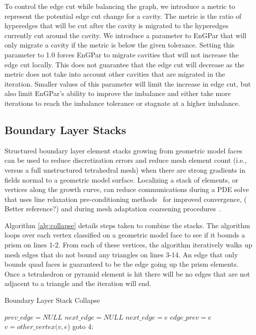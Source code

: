 \documentclass[conference]{IEEEtran}
\begin{document}
To control the edge cut while balancing the graph, we introduce a metric to represent the
potential edge cut change for a cavity. The metric is the ratio of hyperedges that will be cut
after the cavity is migrated to the hyperedges currently cut around the cavity. We introduce a
parameter to EnGPar that will only migrate a cavity if the metric is below the given tolerance.
Setting this parameter to 1.0 forces EnGPar to migrate cavities that will not increase the edge
cut locally. This does not guarantee that the edge cut will decrease as the metric does not take
into account other cavities that are migrated in the iteration. Smaller values of this
parameter will limit the increase in edge cut, but also limit EnGPar's ability to improve the
imbalance and either take more iterations to reach the imbalance tolerance or stagnate at a
higher imbalance.

\subsection{Boundary Layer Stacks}

Structured boundary layer element stacks growing from geometric model faces can
be used to reduce discretization errors and reduce mesh element count (i.e., versus
a full unstructured tetrahedral mesh) when there are strong gradients in
fields normal to a geometric model surface.
Localizing a stack of elements, or vertices along the growth curve, can reduce
communications during a PDE solve that uses line relaxation pre-conditioning
methods~\cite{wesseling2001311} for improved convergence, ({\color{red} Better
reference?}) and during mesh adaptation coarsening
procedures~\cite{chitale-aiaa14,Sahn07,loseille20093d}.

Algorithm \ref{alg:collapse} details steps taken to
combine the stacks. The algorithm loops over each vertex classified on a geometric
model face to see if it bounds a prism on lines 1-2. From each of these vertices, the
algorithm iteratively walks up mesh edges that do not bound any triangles on lines 3-14. An edge
that only bounds quad faces is guaranteed to be the edge going up the prism elements. Once
a tetrahedron or pyramid element is hit there will be no edges that are not adjacent to a triangle
and the iteration will end.
\begin{algorithm}
  \caption{Boundary Layer Stack Collapse}
  \label{alg:collapse}
  \small
  \begin{algorithmic}[1]
    \State $prev\_edge = NULL$
    \State $next\_edge = NULL$
    \State $next\_edge = e$
    \EndIf
    \EndFor
    \State $edge\_prev = e$
    \State $v = other\_vertex(v,e$)
    \State goto 4:
    \EndIf
    \EndIf
    \EndFor
  \end{algorithmic}
\end{algorithm}
\end{document}
